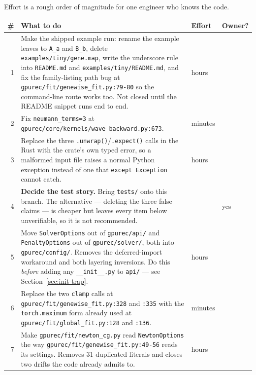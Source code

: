 \documentclass[11pt]{article}
\newcommand{\loc}[1]{\nolinkurl{#1}}
\newcommand{\dir}[1]{\nolinkurl{#1}}
\begin{document}
Effort is a rough order of magnitude for one engineer who knows the code.

\begin{center}
\begin{longtable}{@{}rp{}ll@{}}
\toprule
\# & What to do & Effort & Owner? \\
\midrule
\endhead
1 & Make the shipped example run: rename the example leaves to \texttt{A\_a}
    and \texttt{B\_b}, delete \dir{examples/tiny/gene.map}, write the
    underscore rule into \dir{README.md} and
    \dir{examples/tiny/README.md}, and fix the family-listing path bug at
    \loc{gpurec/fit/genewise\_fit.py:79-80} so the command-line route works
    too.  Not closed until the README snippet runs end to end.
  & hours & \\
2 & Fix \texttt{neumann\_terms=3} at
    \loc{gpurec/core/kernels/wave\_backward.py:673}.
  & minutes & \\
3 & Replace the three \texttt{.unwrap()}/\texttt{.expect()} calls in the Rust
    with the crate's own typed error, so a malformed input file raises a normal
    Python exception instead of one that \texttt{except Exception} cannot catch.
  & hours & \\
4 & \textbf{Decide the test story.}  Bring \dir{tests/} onto this branch.  The
    alternative --- deleting the three false claims --- is cheaper but leaves
    every item below unverifiable, so it is not recommended.
  & --- & yes \\
5 & Move \texttt{SolverOptions} out of \dir{gpurec/api/} and
    \texttt{PenaltyOptions} out of \dir{gpurec/solver/}, both into
    \dir{gpurec/config/}.  Removes the deferred-import workaround and both
    layering inversions.  Do this \emph{before} adding any
    \texttt{\_\_init\_\_.py} to \dir{api/} --- see
    Section~\ref{sec:init-trap}.
  & hours & \\
6 & Replace the two \texttt{clamp} calls at
    \loc{gpurec/fit/genewise\_fit.py:328} and \loc{:335} with the
    \texttt{torch.maximum} form already used at
    \loc{gpurec/fit/global\_fit.py:128} and \loc{:136}.
  & minutes & \\
7 & Make \dir{gpurec/fit/newton\_cg.py} read \texttt{NewtonOptions} the way
    \loc{gpurec/fit/genewise\_fit.py:49-56} reads its settings.  Removes 31
    duplicated literals and closes two drifts the code already admits to.
  & hours & \\

\end{longtable}
\end{center}
\end{document}
